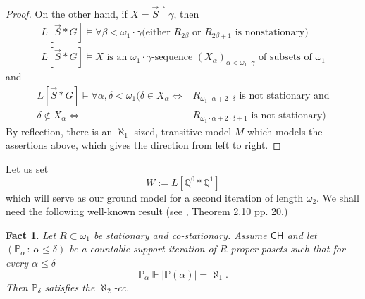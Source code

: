 \documentclass[a4paper,11pt]{article}
\newtheorem{fact}[theorem]{Fact}
\newcommand{\forceP}{\mathbb{P}}
\newcommand{\forceQ}{\mathbb{Q}}
\newcommand{\CH}{\mathsf{CH}}
\begin{document}
\begin{proof}
On the other hand, if $X=\vec{S} \upharpoonright \gamma$, then
\begin{align*}
L[\vec{S} \ast G] \models \forall \beta< \omega_1 \cdot \gamma (\text{either  $R_{2\beta}$ or $R_{2\beta+1}$ is nonstationary) } \\ 
L[\vec{S} \ast G]  \models X \text{ is an $\omega_1 \cdot \gamma$-sequence $(X_{\alpha})_{\alpha < \omega_1 \cdot \gamma}$ of subsets of $\omega_1$}
\end{align*}
and
\begin{align*}
L[\vec{S} \ast G] \models  \forall \alpha, \delta < \omega_1 (\delta  \in X_{\alpha} \Leftrightarrow & R_{\omega_1 \cdot \alpha + 2 \cdot \delta } \text{ is not stationary and} \\ 
\delta  \notin X_{\alpha} \Leftrightarrow&  R_{\omega_1 \cdot \alpha + 2 \cdot \delta +1} \text{ is not stationary})
\end{align*}
By reflection, there is an $\aleph_1$-sized, transitive model $M$ which models the assertions above, which gives the direction from left to right.

\end{proof}


Let us set \[W:= L[\forceQ^0\ast \forceQ^1 ]\] which will serve as our ground model for a second iteration of length $\omega_2$. We shall need the following
well-known result (see \cite{Abraham}, Theorem 2.10 {pp. 20}.)
\begin{fact}
Let $R\subset \omega_1$ be stationary and co-stationary.
Assume $\CH$ and let $(\forceP_{\alpha} \, : \, \alpha \le \delta)$ be a
countable support iteration of $R$-proper posets such
that for every $\alpha \le \delta$
\[ \forceP_{\alpha} \Vdash |\forceP(\alpha)| = \aleph_1. \]
Then $\forceP_{\delta}$ satisfies the $\aleph_2$-cc.
\end{fact}
\end{document}
